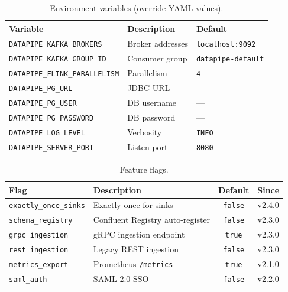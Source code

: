 \documentclass[
    language=english,
    doctype=article,
    institution=none,
]{../../omnilatex}
\begin{document}
\begin{table}[htbp]
    \centering
    \caption{Environment variables (override YAML values).}
    \label{tab:env-vars}
    \begin{tabular}{@{}lp{5.5cm}p{3cm}@{}}
        \toprule
        \textbf{Variable} & \textbf{Description} & \textbf{Default} \\
        \midrule
        \texttt{DATAPIPE\_KAFKA\_BROKERS} & Broker addresses & \texttt{localhost:9092} \\
        \texttt{DATAPIPE\_KAFKA\_GROUP\_ID} & Consumer group & \texttt{datapipe-default} \\
        \texttt{DATAPIPE\_FLINK\_PARALLELISM} & Parallelism & \texttt{4} \\
        \texttt{DATAPIPE\_PG\_URL} & JDBC URL & --- \\
        \texttt{DATAPIPE\_PG\_USER} & DB username & --- \\
        \texttt{DATAPIPE\_PG\_PASSWORD} & DB password & --- \\
        \texttt{DATAPIPE\_LOG\_LEVEL} & Verbosity & \texttt{INFO} \\
        \texttt{DATAPIPE\_SERVER\_PORT} & Listen port & \texttt{8080} \\
        \bottomrule
    \end{tabular}
\end{table}

\begin{table}[htbp]
    \centering
    \caption{Feature flags.}
    \label{tab:flags}
    \begin{tabular}{@{}lp{5cm}cc@{}}
        \toprule
        \textbf{Flag} & \textbf{Description} & \textbf{Default} & \textbf{Since} \\
        \midrule
        \texttt{exactly\_once\_sinks} & Exactly-once for sinks & \texttt{false} & v2.4.0 \\
        \texttt{schema\_registry} & Confluent Registry auto-register & \texttt{false} & v2.3.0 \\
        \texttt{grpc\_ingestion} & gRPC ingestion endpoint & \texttt{true} & v2.3.0 \\
        \texttt{rest\_ingestion} & Legacy REST ingestion & \texttt{false} & v2.3.0 \\
        \texttt{metrics\_export} & Prometheus \texttt{/metrics} & \texttt{true} & v2.1.0 \\
        \texttt{saml\_auth} & SAML 2.0 SSO & \texttt{false} & v2.2.0 \\
        \bottomrule
    \end{tabular}
\end{table}
\end{document}
